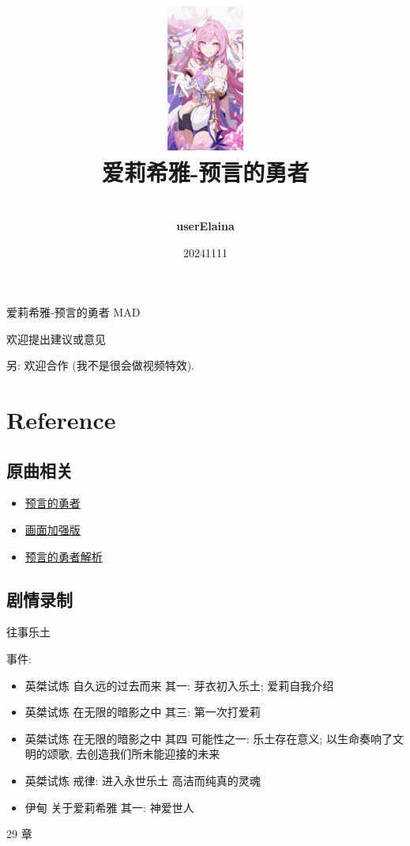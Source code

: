 \documentclass[a4paper]{article}
\title{
    \vspace*{1.0in}
    \includegraphics[width=1in]{figures/100154449_p0.jpg} \\
    \vspace*{1in}
    \textbf{\Huge 爱莉希雅-预言的勇者}
    \vspace{0.5in}
}
\author{ \\
    \textbf{\huge userElaina} \\
    \vspace*{1in}
}
\date{\LARGE 20241111}
\begin{document}
\LARGE

\maketitle
\tableofcontents
\thispagestyle{empty}
\newpage

爱莉希雅-预言的勇者 MAD

欢迎提出建议或意见

另: 欢迎合作 (我不是很会做视频特效).

\section{Reference}

\subsection{原曲相关}

\begin{itemize}
    \item \href{https://www.bilibili.com/video/BV1Zf4y1Z75m/}{预言的勇者}
    \item \href{https://www.bilibili.com/video/BV1rr4y177C9/}{画面加强版}
    \item \href{https://www.bilibili.com/video/BV1KT411z7Vr/}{预言的勇者解析}
\end{itemize}

\subsection{剧情录制}

往事乐土

事件:

\begin{itemize}
    \item 英桀试炼 自久远的过去而来 其一: 芽衣初入乐土; 爱莉自我介绍
    \item 英桀试炼 在无限的暗影之中 其三: 第一次打爱莉
    \item 英桀试炼 在无限的暗影之中 其四 可能性之一: 乐土存在意义; 以生命奏响了文明的颂歌, 去创造我们所未能迎接的未来
    \item 英桀试炼 戒律: 进入永世乐土 高洁而纯真的灵魂
    \item 伊甸 关于爱莉希雅 其一: 神爱世人
\end{itemize}

29 章
\end{document}

